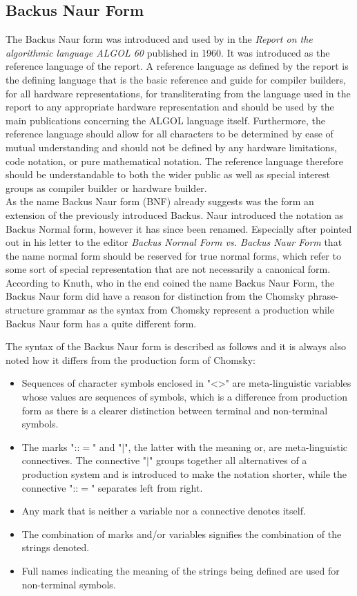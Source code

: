 \documentclass{article}
\begin{document}
\subsection{Backus Naur Form}
The Backus Naur form was introduced and used by \citet{backus1960report} in the \textit{Report on the algorithmic language ALGOL 60} published in 1960. It was introduced as the reference language of the report. A reference language as defined by the report is the defining language that is the basic reference and guide for compiler builders, for all hardware representations, for transliterating from the language used in the report to any appropriate hardware representation and should be used by the main publications concerning the ALGOL language itself. Furthermore, the reference language should allow for all characters to be determined by ease of mutual understanding and should not be defined by any hardware limitations, code notation, or pure mathematical notation. The reference language therefore should be understandable to both the wider public as well as special interest groups as compiler builder or hardware builder. 
\\
As the name Backus Naur form (BNF) already suggests was the form an extension of the previously introduced Backus.  Naur introduced the notation as Backus Normal form, however it has since been renamed. Especially after \citet{knuth-ba} pointed out in his letter to the editor \textit{Backus Normal Form vs. Backus Naur Form} that the name normal form should be reserved for true normal forms, which refer to some sort of special representation that are not necessarily a canonical form. According to Knuth, who in the end coined the name Backus Naur Form, the Backus Naur form did have a reason for distinction from the Chomsky phrase-structure grammar as the syntax from Chomsky represent a production while Backus Naur form has a quite different form.

The syntax of the Backus Naur form is described as follows and it is always also noted how it differs from the production form of Chomsky:

\begin{itemize}
	\item Sequences of character symbols enclosed in "<>" are meta-linguistic variables whose values are sequences of symbols, which is a difference from production form as there is a clearer distinction between terminal and non-terminal symbols.
	\item The marks "::$=$" and "$|$", the latter with the meaning or, are meta-linguistic connectives. The connective "$|$" groups together all alternatives of a production system and is introduced to make the notation shorter, while the connective "::$=$" separates left from right.
	\item Any mark that is neither a variable nor a connective denotes itself.
	\item The combination of marks and/or variables signifies the combination of the strings denoted.
	\item Full names indicating the meaning of the strings being defined are used for non-terminal symbols.
\end{itemize}
\end{document}
